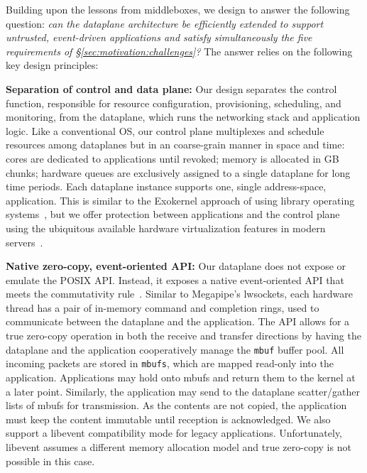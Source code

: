 
Building upon the lessons from middleboxes, we design \ix to answer
the following question: {\it can the dataplane architecture be
  efficiently extended to support untrusted, event-driven applications
  and satisfy simultaneously the five requirements of
  \S\ref{sec:motivation:challenges}?}  The answer relies on the
following key design principles:


{\bf Separation of control and data plane:} 
Our design separates the control function, responsible for resource
configuration, provisioning, scheduling, and monitoring, from the
dataplane, which runs the networking stack and application logic.
Like a conventional OS, our control plane multiplexes and schedule
resources among dataplanes but in an coarse-grain manner in space and
time: cores are dedicated to applications until revoked; memory is
allocated in GB chunks; hardware queues are exclusively assigned to a
single dataplane for long time periods. Each dataplane instance
supports one, single address-space, application.  This is similar to
the Exokernel approach of using library operating
systems~\cite{DBLP:conf/sosp/EnglerKO95}, but we offer protection
between applications and the control plane using the ubiquitous
available hardware virtualization features in modern
servers~\cite{DBLP:journals/computer/UhligNRSMABKLS05,belay2012dune}.

{\bf Native zero-copy, event-oriented API:} Our dataplane does not
expose or emulate the POSIX API.  Instead, it exposes a native
event-oriented API that meets the commutativity
rule~\cite{DBLP:conf/sosp/ClementsKZMK13}. Similar to Megapipe's
lwsockets, each hardware thread has a pair of in-memory command and
completion rings, used to communicate between the dataplane and the
application. The API allows for a true zero-copy operation in both the
receive and transfer directions by having the dataplane and the
application cooperatively manage the \texttt{mbuf} buffer pool.  All
incoming packets are stored in \texttt{mbufs}, which are mapped
read-only into the application. Applications may hold onto mbufs and
return them to the kernel at a later point.  Similarly, the
application may send to the dataplane scatter/gather lists of mbufs
for transmission. As the contents are not copied, the application must
keep the content immutable until reception is acknowledged.  We also
support a libevent compatibility mode for legacy
applications. Unfortunately, libevent assumes a different memory
allocation model and true zero-copy is not possible in this case.


